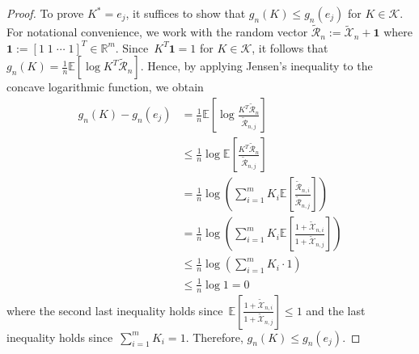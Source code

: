 \documentclass[10pt]{article} %
\begin{document}
	\begin{proof}
		To prove $K^* = e_j$, it suffices to show that $g_n(K) \leq g_n(e_j)$ for $K \in \mathcal{K}$. 
		For notational convenience, we work with the random vector $\widetilde{\mathcal{R}}_n := \widetilde{\mathcal{X}}_n + \textbf{1}$ where $\textbf{1} := [1 \; 1 \; \cdots \; 1]^T \in \mathbb{R}^m.$ 
		Since~$K^T\textbf{1} = 1$ for $K \in \mathcal{K}$, it follows that
		$
		g_n(K) = \frac{1}{n} \mathbb{E}[\log K^T\widetilde{\mathcal{R}}_n].
		$
		Hence, by applying Jensen's inequality to the concave logarithmic function, we obtain
		\begin{align*}
			g_n(K) - g_n(e_j) 
			& = \frac{1}{n} \mathbb{E} \left[ \log \frac{K^T \widetilde{\mathcal{R}}_n}{\widetilde{\mathcal{R}}_{n,j}}\right] \\
			& \leq \frac{1}{n} \log \mathbb{E}\left[ \frac{K^T \widetilde{\mathcal{R}}_n}{\widetilde{\mathcal{R}}_{n,j}} \right]\\
			&= \frac{1}{n} \log \left( \sum_{i=1}^m K_i \mathbb{E} \left[ \frac{ \widetilde{\mathcal{R}}_{n,i}}{\widetilde{\mathcal{R}}_{n,j}} \right] \right) \\
			&= \frac{1}{n} \log \left( \sum_{i=1}^m K_i \mathbb{E} \left[ \frac{ 1+\widetilde{\mathcal{X}}_{n,i}}{ 1+ \widetilde{\mathcal{X}}_{n,j}} \right] \right) \\
			&\leq \frac{1}{n} \log \left( \sum_{i=1}^m K_i \cdot 1 \right)\\
			& \leq \frac{1}{n} \log 1 = 0
		\end{align*}
		where the second last inequality holds since~$\mathbb{E} \left[ \frac{ 1+\widetilde{\mathcal{X}}_{n,i}}{ 1+ \widetilde{\mathcal{X}}_{n,j}} \right] \leq 1$ and the last inequality holds since~$\sum_{i=1}^mK_i = 1$. Therefore,
		$
		g_n(K)  \leq g_n(e_j). 
		$
	\end{proof}	
	
\end{document}
